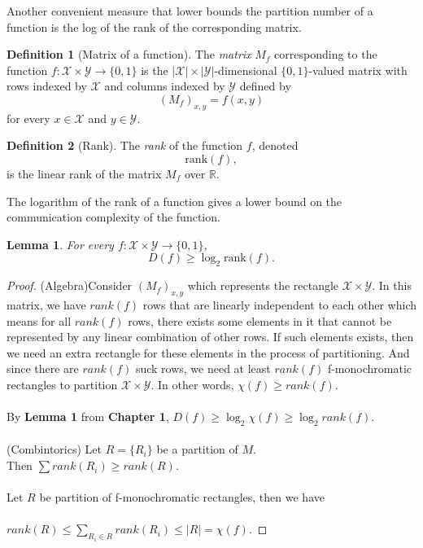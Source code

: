 \documentclass[11pt,oneside]{book}
\theoremstyle{plain}
\newtheorem{lemma}{Lemma}
\theoremstyle{definition}
\newtheorem{definition}{Definition}
\theoremstyle{plain}
\newcommand{\calX}{\mathcal{X}}
\newcommand{\calY}{\mathcal{Y}}
\newcommand{\R}{\mathbb{R}}
\newcommand{\rank}{\mathrm{rank}}
\begin{document}
Another convenient measure that lower bounds the partition number of a function is the log of the rank of the corresponding matrix.

\begin{definition}[Matrix of a function]
	The \emph{matrix} $M_f$ corresponding to the function $f : \calX \times \calY \to \{0,1\}$ is the $|\calX| \times |\calY|$-dimensional $\{0,1\}$-valued matrix with rows indexed by $\calX$ and columns indexed by $\calY$ defined by
	\[
	(M_f)_{x,y} = f(x,y)
	\]
	for every $x \in \calX$ and $y \in \calY$.
\end{definition}

\begin{definition}[Rank]
	The \emph{rank} of the function $f$, denoted
	\[
	\rank(f),
	\] 
	is the linear rank of the matrix $M_f$ over $\R$.
\end{definition}

The logarithm of the rank of a function gives a lower bound on the communication complexity of the function.

\begin{lemma}
	\label{lem:logrank}
	For every $f : \calX \times \calY \to \{0,1\}$,
	\[
	D(f) \ge \log_2 \rank(f).
	\]
\end{lemma}

\begin{proof}
	(Algebra)Consider $(M_f)_{x,y}$ which represents the rectangle $\calX \times \calY$. In this matrix, we have $rank(f)$ rows that are linearly independent to each other which means for all $rank(f)$ rows, there exists some elements in it that cannot be represented by any linear combination of other rows. If such elements exists, then we need an extra rectangle for these elements in the process of partitioning. And since there are $rank(f)$ suck rows, we need at least $rank(f)$ f-monochromatic rectangles to partition $\calX \times \calY$. In other words, $\chi(f) \ge rank(f)$. \\
	\\
	By \textbf{Lemma 1} from \textbf{Chapter 1}, $D(f) \ge \log_2 \chi(f) \ge \log_2 rank(f)$. \\
	 \\
	(Combintorics) Let $R=\{R_i\}$ be a partition of $M$. \\
	Then $\sum rank(R_i) \ge rank(R)$.\\
	 \\
	Let $R$ be partition of f-monochromatic rectangles, then we have \\
	 \\
	$rank(R) \leq \sum_{R_i\in R} rank(R_i) \leq |R| = \chi(f)$.
	
\end{proof}
\end{document}

